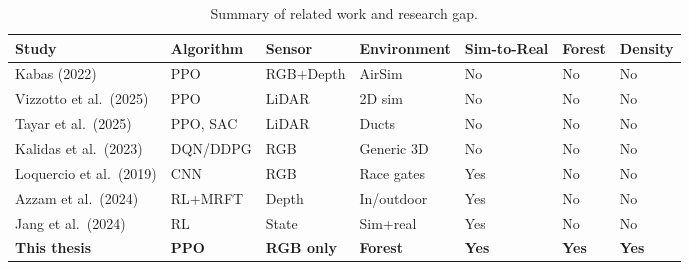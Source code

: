 \begin{table}[H]
    \small
    \centering
    \caption{Summary of related work and research gap.}
    \label{tab:related_work}
    \begin{tabular}{p{3.5cm} p{1.5cm} p{1.8cm} p{2.2cm} p{1.8cm} p{1.3cm} p{1.3cm}}
        \hline\hline
        \rowcolor{lightgray}\textbf{Study} & \textbf{Algorithm} & \textbf{Sensor} & \textbf{Environment} & \textbf{Sim-to-Real} & \textbf{Forest} & \textbf{Density} \\\hline
        Kabas (2022) \cite{Kabas2022} & PPO & RGB+Depth & AirSim & No & No & No \\
        \rowcolor{lightlightgray} Vizzotto et al.\ (2025) \cite{Vizzotto2025} & PPO & LiDAR & 2D sim & No & No & No \\
        Tayar et al.\ (2025) \cite{Tayar2025} & PPO, SAC & LiDAR & Ducts & No & No & No \\
        \rowcolor{lightlightgray} Kalidas et al.\ (2023) \cite{Kalidas2023} & DQN/DDPG & RGB & Generic 3D & No & No & No \\
        Loquercio et al.\ (2019) \cite{Loquercio2019} & CNN & RGB & Race gates & Yes & No & No \\
        \rowcolor{lightlightgray} Azzam et al.\ (2024) \cite{Azzam2024} & RL+MRFT & Depth & In/outdoor & Yes & No & No \\
        Jang et al.\ (2024) \cite{Jang2024} & RL & State & Sim+real & Yes & No & No \\
        \rowcolor{lightgray} \textbf{This thesis} & \textbf{PPO} & \textbf{RGB only} & \textbf{Forest} & \textbf{Yes} & \textbf{Yes} & \textbf{Yes} \\
        \hline
    \end{tabular}
\end{table}
